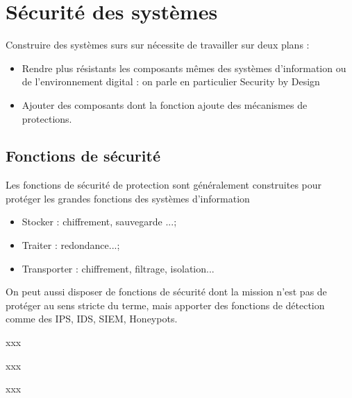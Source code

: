 
\section{Sécurité des systèmes }

Construire des systèmes surs sur nécessite  de travailler sur deux plans :

\begin{itemize}
\item Rendre plus résistants les composants mêmes des systèmes d’information ou de l’environnement digital : on parle en particulier Security by Design
\item Ajouter des composants dont la fonction ajoute des mécanismes de protections.
\end{itemize}

\subsection{Fonctions de sécurité}

Les fonctions de sécurité de protection sont généralement construites pour protéger les grandes fonctions des systèmes d’information
\begin{itemize}
\item Stocker : chiffrement, sauvegarde ...;
\item Traiter : redondance...;
\item Transporter : chiffrement, filtrage, isolation...
\end{itemize}

On peut aussi disposer de fonctions de sécurité dont la mission n’est pas de protéger au sens stricte du terme, mais apporter des fonctions de détection comme des IPS, IDS, SIEM, Honeypots. 

\begin{nota}
xxx
\end{nota}
\begin{nota}
xxx
\end{nota}
\begin{nota}
xxx
\end{nota}

